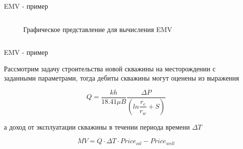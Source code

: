 \begin{frame}{EMV - пример}
\begin{columns}
\begin{column}{0.5\textwidth}
\begin{center}
\begin{figure}[h!]
                	\label{ris:chance_node}
                	\caption{Графическое представление для вычисления EMV}
                \end{figure}
             
             \end{center}
        \end{column}
    \end{columns}


\end{frame}
\begin{frame}{EMV - пример}

	Рассмотрим задачу строительства новой скважины на месторождении с заданными параметрами, тогда дебиты скважины могут оценены из выражения
	
	
	\begin{equation}
		Q = \frac{kh}{18.41 \mu B} \frac{\Delta P}{  \left( ln\dfrac{r_e}{r_w} + S\right) }
		\label{eq:eq_q}
	\end{equation}
	
	
	а доход от эксплуатации скважины в течении периода времени  $\Delta T$
	
	\begin{equation}
		MV = Q \cdot  \Delta T \cdot  Price_{oil} - Price_{well}
		\label{eq:eq_MV}
	\end{equation}

\end{frame}
